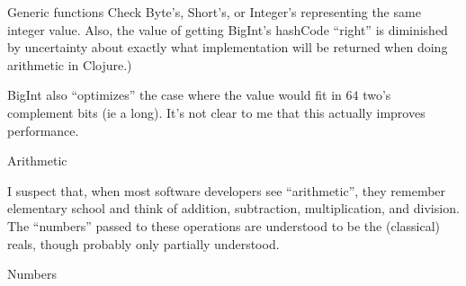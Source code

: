 \documentclass[12pt]{PalisadesLakesBook}
\begin{document}
\begin{plSection}{Generic functions}
Check {\javaFont Byte}'s, {\javaFont Short's}, or
{\javaFont Integer}'s representing the same integer value.
Also, the value of getting {\javaFont BigInt}'s 
{\javaFont hashCode} ``right'' is diminished by uncertainty
about exactly what implementation will be returned when
doing arithmetic in Clojure.) 

{\javaFont BigInt} also ``optimizes'' the case where the value
would fit in $64$ two's complement bits (ie a {\javaFont long}).
It's not clear to me that this actually improves performance.



\end{plSection}%
\begin{plSection}{Arithmetic} 

I suspect that, when most software developers see ``arithmetic'',
they remember elementary school
and think of addition, subtraction, multiplication, and division.
The ``numbers'' passed to these operations are 
understood to be the (classical) reals, 
though probably only partially understood.


\end{plSection}%
\begin{plSection}{Numbers} 


\end{plSection}%
\end{document}
